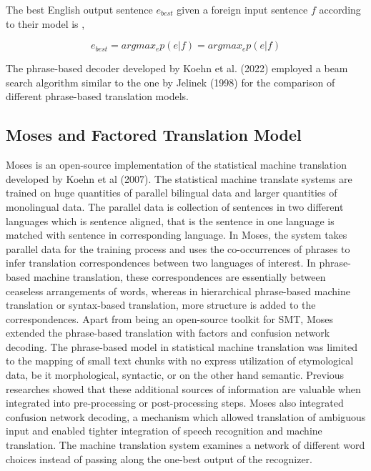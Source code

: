 The best English output sentence $e_{best}$ given a foreign input sentence $f$ according to their model is ,

$$
 e_{best}= argmax_ep(e|f)
         = argmax_ep(e|f)
$$




The phrase-based decoder developed by Koehn et al. (2022) employed a beam search algorithm similar to the one by Jelinek (1998)  for the comparison of different phrase-based translation models.
\subsection{Moses and Factored Translation Model}
Moses is an open-source implementation of the statistical machine translation developed by Koehn et al (2007). The statistical machine translate systems are trained on huge quantities of parallel bilingual data and larger quantities of monolingual data. The parallel data is collection of sentences in two different languages which is sentence aligned, that is the sentence in one language is matched with sentence in corresponding language. In Moses, the system takes parallel data for the training process and uses the co-occurrences of phrases to infer translation correspondences between two languages of interest. In phrase-based machine translation, these correspondences are essentially between ceaseless arrangements of words, whereas in hierarchical phrase-based machine translation or syntax-based translation, more structure is added to the correspondences. Apart from being an open-source toolkit for SMT, Moses extended the phrase-based translation with factors and confusion network decoding. The phrase-based model in statistical machine translation was limited to the mapping of small text chunks with no express utilization of etymological data, be it morphological, syntactic, 
or on the other hand semantic. Previous researches showed that these additional sources of information are valuable when integrated into pre-processing or post-processing steps. Moses also integrated confusion network decoding, a mechanism which allowed translation of ambiguous input and enabled tighter integration of speech recognition and machine translation. The machine translation system examines a network of different word choices instead of passing along the one-best output of the recognizer. 

